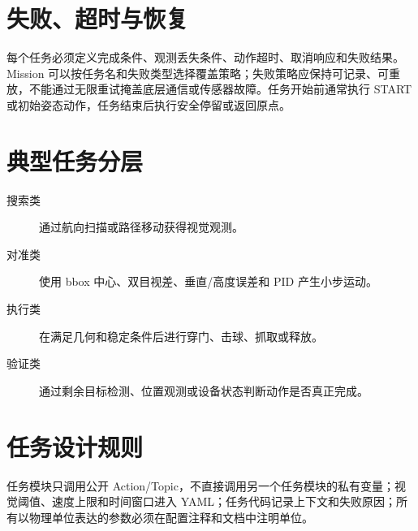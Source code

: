 \section{失败、超时与恢复}
每个任务必须定义完成条件、观测丢失条件、动作超时、取消响应和失败结果。Mission 可以按任务名和失败类型选择覆盖策略；失败策略应保持可记录、可重放，不能通过无限重试掩盖底层通信或传感器故障。任务开始前通常执行 START 或初始姿态动作，任务结束后执行安全停留或返回原点。

\section{典型任务分层}
\begin{description}
  \item[搜索类] 通过航向扫描或路径移动获得视觉观测。
  \item[对准类] 使用 bbox 中心、双目视差、垂直/高度误差和 PID 产生小步运动。
  \item[执行类] 在满足几何和稳定条件后进行穿门、击球、抓取或释放。
  \item[验证类] 通过剩余目标检测、位置观测或设备状态判断动作是否真正完成。
\end{description}

\section{任务设计规则}
任务模块只调用公开 Action/Topic，不直接调用另一个任务模块的私有变量；视觉阈值、速度上限和时间窗口进入 YAML；任务代码记录上下文和失败原因；所有以物理单位表达的参数必须在配置注释和文档中注明单位。

